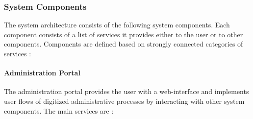 \documentclass[
     12pt,         %
     a4paper,      %
     BCOR=10mm,version=first,     %
     DIV=14,version=first,        %
     ]{scrreprt}
\begin{document}
\subsubsection{System Components}
The system architecture consists of the following system components. Each component consists of a list of services it provides either to the user or to other components. Components are defined based on strongly connected categories of services \cite{NRW:Umsetzung}:

\paragraph{Administration Portal}
The administration portal provides the user with a web-interface and implements user flows of digitized administrative processes by interacting with other system components. The main services are \cite{NRW:Umsetzung}:
\end{document}
